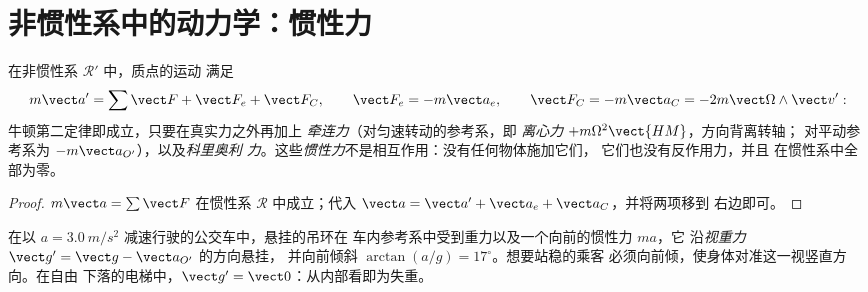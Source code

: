 \section{非惯性系中的动力学：惯性力}

\begin{theorem}[非惯性系中的牛顿定律]\label{thm:b1:non-inertial-frames:dynamics}
在非惯性系 $\mathcal R'$ 中，质点的运动
满足
\[
m\vect a' = \sum\vect F + \vect F_e + \vect F_C, \qquad
\vect F_e = -m\vect a_e, \qquad \vect F_C = -m\vect a_C = -2m\vect\Omega\wedge\vect v' :
\]
牛顿第二定律即成立，只要在真实力之外再加上
\emph{牵连力}（对匀速转动的参考系，即
\emph{离心力} $+m\Omega^2\vect{HM}$，方向背离转轴；
对平动参考系为 $-m\vect a_{O'}$），以及\emph{科里奥利
力}。这些\emph{惯性力}不是相互作用：没有任何物体施加它们，
它们也没有反作用力，并且
在惯性系中全部为零。
\end{theorem}

\begin{proof}
$m\vect a = \sum\vect F$ 在惯性系 $\mathcal R$ 中成立；代入
$\vect a = \vect a' + \vect a_e + \vect a_C$，并将两项移到
右边即可。
\end{proof}

\begin{example}[乘车的乘客与铅锤]\label{ex:b1:non-inertial-frames:bus}
在以 $a = \qty{3.0}{m/s^2}$ 减速行驶的公交车中，悬挂的吊环在
车内参考系中受到重力以及一个向前的惯性力 $ma$，它
沿\emph{视重力} $\vect g' = \vect g - \vect a_{O'}$ 的方向悬挂，
并向前倾斜 $\arctan(a/g) = 17^\circ$。想要站稳的乘客
必须向前倾，使身体对准这一视竖直方向。在自由
下落的电梯中，$\vect g' = \vect 0$：从内部看即为失重。
\end{example}

